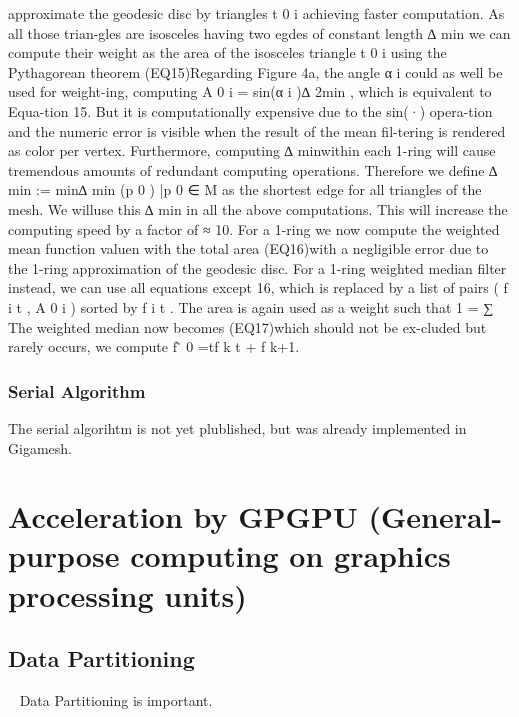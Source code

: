 \documentclass[openany]{book}
\begin{document}
approximate the geodesic disc by triangles t 0 i achieving faster computation. 
As all those trian-gles are isosceles having two egdes of constant length ∆ min 
we can compute their weight as the area of the isosceles triangle t 0 i using 
the Pythagorean theorem
(EQ15)Regarding Figure 4a, the angle α i could as well be used for weight-ing, 
computing A 0 i = sin(α i )∆ 2min , which is equivalent to Equa-tion 15. But it 
is computationally expensive due to the sin(·) opera-tion and the numeric error 
is visible when the result of the mean fil-tering is rendered as color per 
vertex. Furthermore, computing ∆ minwithin each 1-ring will cause tremendous 
amounts of redundant computing operations. Therefore we define ∆ min := min{∆ 
min (p 0 ) |p 0 ∈ M} as the shortest edge for all triangles of the mesh. We 
willuse this ∆ min in all the above computations. This will increase the 
computing speed by a factor of ≈ 10. For a 1-ring we now compute the weighted 
mean function valuen with the total area
(EQ16)with a negligible error due to the 1-ring approximation of the geodesic 
disc. For a 1-ring weighted median filter instead, we can use all equations 
except 16, which is replaced by a list of pairs ( f i t , A 0 i ) sorted by f 
i t . The area is again used as a weight such that 1 = ∑ The weighted median 
now becomes
(EQ17)which should not be ex-cluded but rarely occurs, we compute f  ̃ 0 =tf k 
t + f k+1.~\cite[s.~3.2]{Mara17}

\subsection{Serial Algorithm}
The serial algorihtm is not yet plublished, but was already implemented in Gigamesh.



\chapter[Acceleration by GPGPU]{Acceleration by GPGPU (General-purpose computing on graphics processing units)}
\section{Data Partitioning}~\cite[p.~357]{Lang17}
Data Partitioning is important.
\end{document}
